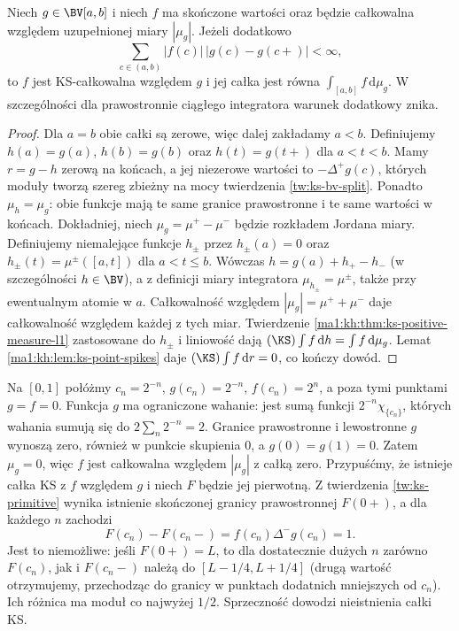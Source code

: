 \begin{twierdzenie}\label{ma1:kh:thm:ks-signed-measure-l1}
Niech $g\in\BV[a,b]$ i niech $f$ ma skończone wartości oraz będzie całkowalna względem uzupełnionej miary $|\mu_g|$. Jeżeli dodatkowo
\[
 \sum_{c\in(a,b)}|f(c)|\,|g(c)-g(c+)|<\infty,
\]
to $f$ jest KS-całkowalna względem $g$ i jej całka jest równa $\int_{[a,b]}f\,\mathrm d\mu_g$. W szczególności dla prawostronnie ciągłego integratora warunek dodatkowy znika.
\end{twierdzenie}
\begin{proof}
Dla $a=b$ obie całki są zerowe, więc dalej zakładamy $a<b$. Definiujemy $h(a)=g(a)$, $h(b)=g(b)$ oraz $h(t)=g(t+)$ dla $a<t<b$. Mamy $r=g-h$ zerową na końcach, a jej niezerowe wartości to $-\Delta^+g(c)$, których moduły tworzą szereg zbieżny na mocy twierdzenia \ref{tw:ks-bv-split}. Ponadto $\mu_h=\mu_g$: obie funkcje mają te same granice prawostronne i te same wartości w końcach. Dokładniej, niech $\mu_g=\mu^+-\mu^-$ będzie rozkładem Jordana miary. Definiujemy niemalejące funkcje $h_\pm$ przez $h_\pm(a)=0$ oraz $h_\pm(t)=\mu^\pm([a,t])$ dla $a<t\le b$. Wówczas $h=g(a)+h_+-h_-$ (w szczególności $h\in\BV$), a z definicji miary integratora $\mu_{h_\pm}=\mu^\pm$, także przy ewentualnym atomie w $a$. Całkowalność względem $|\mu_g|=\mu^++\mu^-$ daje całkowalność względem każdej z tych miar. Twierdzenie \ref{ma1:kh:thm:ks-positive-measure-l1} zastosowane do $h_\pm$ i liniowość dają $(\KS)\int f\,\mathrm dh=\int f\,\mathrm d\mu_g$. Lemat \ref{ma1:kh:lem:ks-point-spikes} daje $(\KS)\int f\,\mathrm dr=0$, co kończy dowód.
\end{proof}
\begin{przyklad}\label{ma1:kh:ex:ks-cancelled-spikes}
Na $[0,1]$ połóżmy $c_n=2^{-n}$, $g(c_n)=2^{-n}$, $f(c_n)=2^n$, a poza tymi punktami $g=f=0$. Funkcja $g$ ma ograniczone wahanie: jest sumą funkcji $2^{-n}\chi_{\{c_n\}}$, których wahania sumują się do $2\sum_n2^{-n}=2$. Granice prawostronne i lewostronne $g$ wynoszą zero, również w punkcie skupienia $0$, a $g(0)=g(1)=0$. Zatem $\mu_g=0$, więc $f$ jest całkowalna względem $|\mu_g|$ z całką zero.
Przypuśćmy, że istnieje całka KS z $f$ względem $g$ i niech $F$ będzie jej pierwotną. Z twierdzenia \ref{tw:ks-primitive} wynika istnienie skończonej granicy prawostronnej $F(0+)$, a dla każdego $n$ zachodzi
\[
 F(c_n)-F(c_n-)=f(c_n)\Delta^-g(c_n)=1.
\]
Jest to niemożliwe: jeśli $F(0+)=L$, to dla dostatecznie dużych $n$ zarówno $F(c_n)$, jak i $F(c_n-)$ należą do $[L-1/4,L+1/4]$ (drugą wartość otrzymujemy, przechodząc do granicy w punktach dodatnich mniejszych od $c_n$). Ich różnica ma moduł co najwyżej $1/2$. Sprzeczność dowodzi nieistnienia całki KS.
\end{przyklad}
